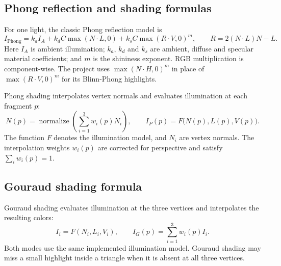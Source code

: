 \subsection{Phong reflection and shading formulas}
For one light, the classic Phong reflection model is
\begin{equation}
I_{\mathrm{Phong}}=k_a I_A+k_d C\max(N\cdot L,0)
+k_s C\max(R\cdot V,0)^m,\qquad R=2(N\cdot L)N-L.
\end{equation}
Here $I_A$ is ambient illumination; $k_a$, $k_d$ and $k_s$ are ambient, diffuse and specular material coefficients; and $m$ is the shininess exponent. RGB multiplication is component-wise. The project uses $\max(N\cdot H,0)^m$ in place of $\max(R\cdot V,0)^m$ for its Blinn-Phong highlights.

Phong shading interpolates vertex normals and evaluates illumination at each fragment $p$:
\begin{equation}
N(p)=\operatorname{normalize}\!\left(\sum_{i=1}^{3}w_i(p)N_i\right),
\qquad I_P(p)=F\bigl(N(p),L(p),V(p)\bigr).
\end{equation}
The function $F$ denotes the illumination model, and $N_i$ are vertex normals. The interpolation weights $w_i(p)$ are corrected for perspective and satisfy $\sum_iw_i(p)=1$.

\subsection{Gouraud shading formula}
Gouraud shading evaluates illumination at the three vertices and interpolates the resulting colors:
\begin{equation}
I_i=F(N_i,L_i,V_i),\qquad
I_G(p)=\sum_{i=1}^{3}w_i(p)I_i.
\end{equation}
Both modes use the same implemented illumination model. Gouraud shading may miss a small highlight inside a triangle when it is absent at all three vertices.
